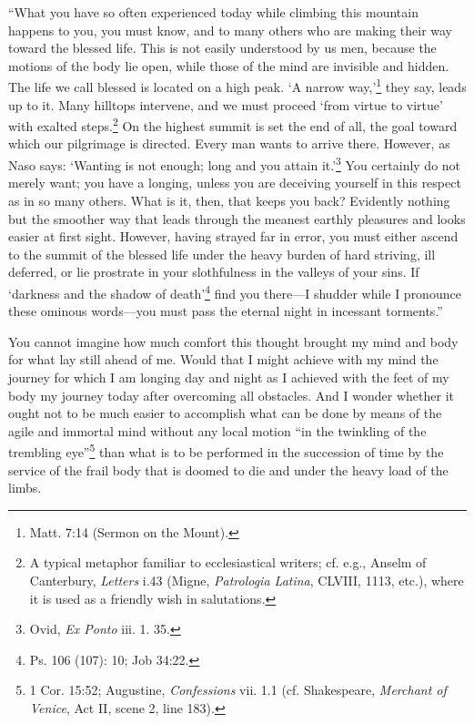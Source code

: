 ``What you have so often experienced today while climbing this
mountain happens to you, you must know, and to many others who are
making their way toward the blessed life. This  is not easily
understood by us men, because the motions of the body lie open, while
those of the mind are invisible and hidden. The life we call blessed
is located on a high peak. `A narrow way,'\footnote{Matt. 7:14 (Sermon
on the Mount).} they say, leads up to it. Many hilltops intervene,
and we must proceed `from virtue to virtue' with exalted
steps.\footnote{A typical metaphor familiar to ecclesiastical writers;
cf. e.g., Anselm of Canterbury, \textit{Letters} i.43 (Migne,
\textit{Patrologia Latina}, CLVIII, 1113, etc.), where it is used as a
friendly wish in salutations.} On the highest summit is set the end of
all, the goal toward which our pilgrimage is directed. Every man wants
to arrive there. However, as Naso says: `Wanting is not enough; long
and you attain it.'\footnote{Ovid, \textit{Ex Ponto} iii. 1. 35.} You
certainly do not merely want; you have a longing, unless you are
deceiving yourself in this respect as in so many others. What is it,
then, that keeps you back? Evidently nothing but the smoother way
that leads through the meanest earthly pleasures and looks easier at
first sight. However, having strayed far in error, you must either
ascend to the summit of the blessed life under the heavy burden of
hard striving, ill deferred, or lie prostrate in your slothfulness in
the valleys of your sins. If `darkness and the shadow of
death'\footnote{Ps. 106 (107): 10; Job 34:22.} find you there---I
shudder while I pronounce these ominous words---you must pass the
eternal night in incessant torments.''

You cannot imagine how much comfort this thought brought my mind and
body for what lay still ahead of me. Would that I might achieve with
my mind the journey for which I am longing day and night as I achieved
with the feet of my body my journey today after overcoming all
obstacles. And I wonder whether it ought not to be much easier to
accomplish what can be done by means of the agile and immortal mind
without any local motion ``in the twinkling of the trembling
eye''\footnote{1 Cor. 15:52; Augustine, \textit{Confessions} vii. 1.1
(cf. Shakespeare, \textit{Merchant of Venice}, Act II, scene 2, line
183).} than what is to be performed in the succession of time by the
service  of the frail body that is doomed to die and under
the heavy load of the limbs.

